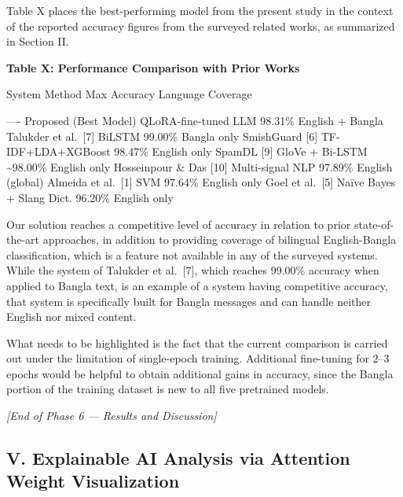 Table X places the best-performing model from the present study in the
context of the reported accuracy figures from the surveyed related
works, as summarized in Section II.

\textbf{Table X: Performance Comparison with Prior Works}

System \textbar{} Method \textbar{} Max Accuracy \textbar{} Language
Coverage \textbar{}

\textbar--\textbar--\textbar-\textbar\textbar{} \textbar{} Proposed
(Best Model) \textbar{} QLoRA-fine-tuned LLM \textbar{} 98.31\%
\textbar{} English + Bangla \textbar{} \textbar{} Talukder et
al.~{[}7{]} \textbar{} BiLSTM \textbar{} 99.00\% \textbar{} Bangla only
\textbar{} \textbar{} SmishGuard {[}6{]} \textbar{} TF-IDF+LDA+XGBoost
\textbar{} 98.47\% \textbar{} English only \textbar{} \textbar{} SpamDL
{[}9{]} \textbar{} GloVe + Bi-LSTM \textbar{} \textasciitilde98.00\%
\textbar{} English only \textbar{} \textbar{} Hosseinpour \& Das
{[}10{]} \textbar{} Multi-signal NLP \textbar{} 97.89\% \textbar{}
English (global) \textbar{} \textbar{} Almeida et al.~{[}1{]} \textbar{}
SVM \textbar{} 97.64\% \textbar{} English only \textbar{} \textbar{}
Goel et al.~{[}5{]} \textbar{} Naïve Bayes + Slang Dict. \textbar{}
96.20\% \textbar{} English only \textbar{}

Our solution reaches a competitive level of accuracy in relation to
prior state-of-the-art approaches, in addition to providing coverage of
bilingual English-Bangla classification, which is a feature not
available in any of the surveyed systems. While the system of Talukder
et al.~{[}7{]}, which reaches 99.00\% accuracy when applied to Bangla
text, is an example of a system having competitive accuracy, that system
is specifically built for Bangla messages and can handle neither English
nor mixed content.

What needs to be highlighted is the fact that the current comparison is
carried out under the limitation of single-epoch training. Additional
fine-tuning for 2--3 epochs would be helpful to obtain additional gains
in accuracy, since the Bangla portion of the training dataset is new to
all five pretrained models.

\emph{{[}End of Phase 6 --- Results and Discussion{]}}

\subsection{V. Explainable AI Analysis via Attention Weight
Visualization}\label{v.-explainable-ai-analysis-via-attention-weight-visualization}

